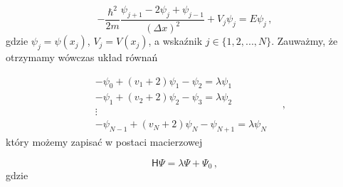 \documentclass{myclass}
\begin{document}
\begin{equation*}
-\frac{\hbar^2}{2m}\frac{\psi_{j+1}-2\psi_{j}+\psi_{j-1}}{(\Delta x)^2}+V_j\psi_j=E\psi_j\,,
\end{equation*}
gdzie \(\psi_j=\psi(x_j)\), \(V_j=V(x_j)\), a wskaźnik \(j\in\{1,2,...,N\}\). Zauważmy, że otrzymamy
wówczas układ równań

\begin{equation*}
\begin{split}
&-\psi_0+(v_1+2)\psi_1-\psi_2=\lambda\psi_1\\
&-\psi_1+(v_2+2)\psi_2-\psi_3=\lambda\psi_2\\
&\vdots\\
&-\psi_{N-1}+(v_N+2)\psi_N-\psi_{N+1}=\lambda\psi_N
\end{split}\quad\,,
\end{equation*}
który możemy zapisać w postaci macierzowej

\begin{equation*}
\boxed{\mathsf{H}\mathsf{\Psi} = \lambda \mathsf{\Psi}+\mathsf{\Psi}_0}\,,
\end{equation*}
gdzie
\end{document}

